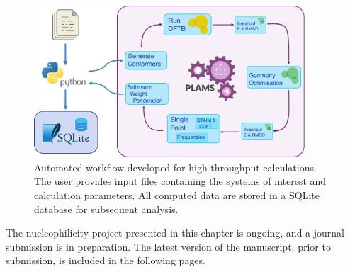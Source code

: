 \vspace*{0.5cm}%
\begin{figure}[htbp]
    \centering
    \includegraphics[width=0.9\textwidth]{diagramas/filter.pdf}
    \caption{Automated workflow developed for high-throughput calculations.
      The user provides input files containing the systems of interest and
      calculation parameters. All computed data are stored in a SQLite database
      for subsequent analysis.}
    \label{filter}
\end{figure}
\vspace*{0.5cm}%

The nucleophilicity project presented in this chapter is ongoing, and a journal
submission is in preparation. The latest version of the manuscript, prior to
submission, is included in the following pages.



